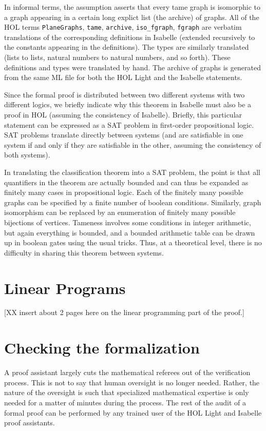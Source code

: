 In informal terms, the assumption asserts that every tame graph is
isomorphic to a graph appearing in a certain long explict list (the
archive) of graphs.  All of the HOL terms \verb!PlaneGraphs!,
\verb!tame!, \verb!archive!, \verb!iso_fgraph!, \verb!fgraph! are
verbatim translations of the corresponding definitions in Isabelle
(extended recursively to the constants appearing in the definitions).
The types are similarly translated (lists to lists, natural numbers to
natural numbers, and so forth).  These definitions and types were
translated by hand.  The archive of graphs is generated from the same
ML file for both the HOL Light and the Isabelle statements.


Since the formal proof is distributed between two different systems
with two different logics, we briefly indicate why this theorem in
Isabelle must also be a proof in HOL (assuming the consistency of
Isabelle).  Briefly, this particular statement can be expressed as a
SAT problem in first-order propositional logic.  SAT problems 
translate directly between systems (and are satisfiable in one system
if and only if they are satisfiable in the other, assuming the consistency
of both systems).

In translating the classification theorem into a SAT problem,
 the point is that all quantifiers in the theorem are actually
bounded and can thus be expanded as finitely many cases in
propositional logic.  Each of the finitely many possible graphs can be
specified by a finite number of boolean conditions.  Similarly, graph
isomorphism can be replaced by an enumeration of finitely many
possible bijections of vertices.  Tameness involves some conditions in
integer arithmetic, but again everything is bounded, and a bounded arithmetic
table can be drawn up in boolean gates using the usual tricks.
Thus, at a theoretical level, there is no difficulty in sharing this
theorem between systems.

\section{Linear Programs}

[XX insert about 2 pages here on the linear programming part of the proof.]

\section{Checking the formalization}

A proof assistant largely cuts the mathematical referees out of the
verification process.  This is not to say that human oversight is no
longer needed.  Rather, the nature of the oversight is such that
specialized mathematical expertise is only needed for a matter of minutes
during the process.  The rest of the audit of a formal proof can be
performed by any trained user of the HOL Light and Isabelle proof
assistants.

